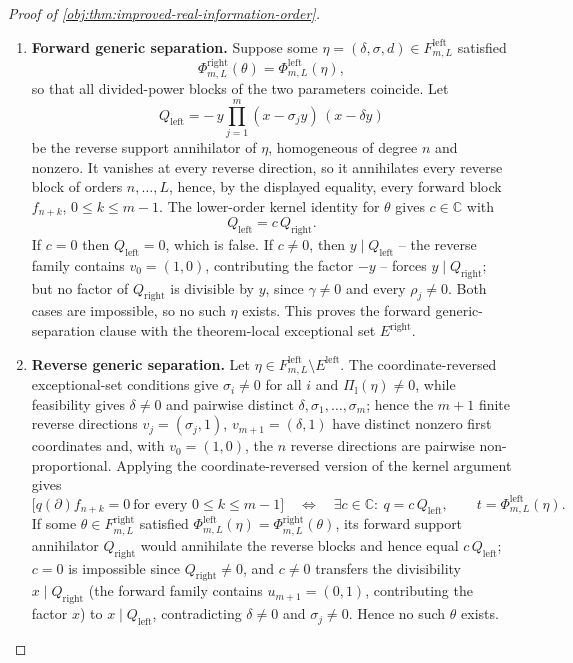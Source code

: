 \documentclass[11pt]{article}
\begin{document}
\begin{proof}[Proof of \cref{obj:thm:improved-real-information-order}]
\begin{enumerate}
\item \textbf{Forward generic separation.}  Suppose some \(\eta=(\delta,\sigma,d)\in F^{\mathrm{left}}_{m,L}\) satisfied
\[
\Phi^{\mathrm{right}}_{m,L}(\theta)=\Phi^{\mathrm{left}}_{m,L}(\eta),
\]
so that all divided-power blocks of the two parameters coincide.  Let
\[
Q_{\mathrm{left}}=-\,y\prod_{j=1}^{m}(x-\sigma_jy)\,(x-\delta y)
\]
be the reverse support annihilator of \(\eta\), homogeneous of degree \(n\) and nonzero.  It vanishes at every reverse direction, so it annihilates every reverse block of orders \(n,\ldots,L\), hence, by the displayed equality, every forward block \(f_{n+k}\), \(0\le k\le m-1\).  The lower-order kernel identity for \(\theta\) gives \(c\in\mathbb C\) with
\[
Q_{\mathrm{left}}=c\,Q_{\mathrm{right}} .
\]
If \(c=0\) then \(Q_{\mathrm{left}}=0\), which is false.  If \(c\ne0\), then \(y\mid Q_{\mathrm{left}}\) -- the reverse family contains \(v_0=(1,0)\), contributing the factor \(-y\) -- forces \(y\mid Q_{\mathrm{right}}\); but no factor of \(Q_{\mathrm{right}}\) is divisible by \(y\), since \(\gamma\ne0\) and every \(\rho_j\ne0\).  Both cases are impossible, so no such \(\eta\) exists.  This proves the forward generic-separation clause with the theorem-local exceptional set \(E^{\mathrm{right}}\).

\item \textbf{Reverse generic separation.}  Let \(\eta\in F^{\mathrm{left}}_{m,L}\setminus E^{\mathrm{left}}\).  The coordinate-reversed exceptional-set conditions give \(\sigma_i\ne0\) for all \(i\) and \(\Pi_{\mathrm l}(\eta)\ne0\), while feasibility gives \(\delta\ne0\) and pairwise distinct \(\delta,\sigma_1,\ldots,\sigma_m\); hence the \(m+1\) finite reverse directions \(v_j=(\sigma_j,1)\), \(v_{m+1}=(\delta,1)\) have distinct nonzero first coordinates and, with \(v_0=(1,0)\), the \(n\) reverse directions are pairwise non-proportional.  Applying the coordinate-reversed version of the kernel argument gives
\[
\bigl[q(\partial)f_{n+k}=0\ \text{for every }0\le k\le m-1\bigr]
\quad\Longleftrightarrow\quad
\exists c\in\mathbb C:\ q=c\,Q_{\mathrm{left}},
\qquad t=\Phi^{\mathrm{left}}_{m,L}(\eta).
\]
If some \(\theta\in F^{\mathrm{right}}_{m,L}\) satisfied \(\Phi^{\mathrm{left}}_{m,L}(\eta)=\Phi^{\mathrm{right}}_{m,L}(\theta)\), its forward support annihilator \(Q_{\mathrm{right}}\) would annihilate the reverse blocks and hence equal \(c\,Q_{\mathrm{left}}\); \(c=0\) is impossible since \(Q_{\mathrm{right}}\ne0\), and \(c\ne0\) transfers the divisibility \(x\mid Q_{\mathrm{right}}\) (the forward family contains \(u_{m+1}=(0,1)\), contributing the factor \(x\)) to \(x\mid Q_{\mathrm{left}}\), contradicting \(\delta\ne0\) and \(\sigma_j\ne0\).  Hence no such \(\theta\) exists.


\end{enumerate}
\end{proof}
\end{document}
